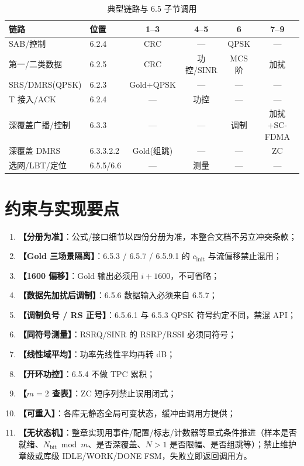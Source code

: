 \documentclass[11pt,a4paper]{ctexart}
\begin{document}
\begin{longtable}{L{3.8cm}L{2.2cm}cccc}
\caption{典型链路与 6.5 子节调用\label{tab:65-link}} \\
\toprule
\textbf{链路} & \textbf{位置} & \textbf{1--3} & \textbf{4--5} & \textbf{6} & \textbf{7--9} \\
\midrule
SAB/控制 & 6.2.4 & CRC & --- & QPSK & --- \\
第一/二类数据 & 6.2.5 & CRC & 功控/SINR & MCS 阶 & 加扰 \\
SRS/DMRS(QPSK) & 6.2.3 & Gold+QPSK & --- & --- & --- \\
T 接入/ACK & 6.2.4 & --- & 功控 & --- & --- \\
深覆盖广播/控制 & 6.3.3 & --- & --- & 调制 & 加扰+SC-FDMA \\
深覆盖 DMRS & 6.3.3.2.2 & Gold(组跳) & --- & --- & ZC \\
选网/LBT/定位 & 6.5.5/6.6 & --- & 测量 & --- & --- \\
\bottomrule
\end{longtable}

\section{约束与实现要点}

\begin{enumerate}[nosep]
  \item \textbf{【分册为准】}：公式/接口细节以四份分册为准，本整合文档不另立冲突条款；
  \item \textbf{【Gold 三场景隔离】}：6.5.3 / 6.5.7 / 6.5.9.1 的 $c_{\mathrm{init}}$ 与流偏移禁止混用；
  \item \textbf{【1600 偏移】}：Gold 输出必须用 $i{+}1600$，不可省略；
  \item \textbf{【数据先加扰后调制】}：6.5.6 数据输入必须来自 6.5.7；
  \item \textbf{【调制负号 / RS 正号】}：6.5.6.1 与 6.5.3 QPSK 符号约定不同，禁混 API；
  \item \textbf{【同符号测量】}：RSRQ/SINR 的 RSRP/RSSI 必须同符号；
  \item \textbf{【线性域平均】}：功率先线性平均再转 dB；
  \item \textbf{【开环功控】}：6.5.4 不做 TPC 累积；
  \item \textbf{【$m{=}2$ 查表】}：ZC 短序列禁止误用闭式；
  \item \textbf{【可重入】}：各库无静态全局可变状态，缓冲由调用方提供；
  \item \textbf{【无状态机】}：整章实现用事件/配置/标志/计数器等显式条件推进（样本是否就绪、$N_{\mathrm{bit}}\bmod m$、是否深覆盖、$N{>}1$ 是否限幅、是否组跳等）；禁止维护章级或库级 IDLE/WORK/DONE FSM，失败立即返回调用方。
\end{enumerate}
\end{document}
